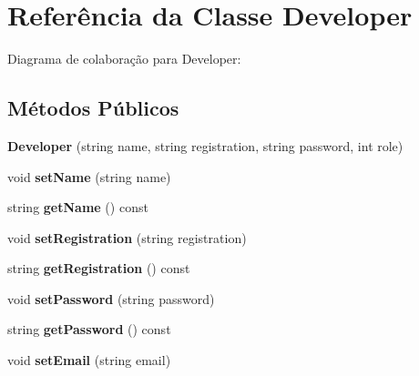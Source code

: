 \hypertarget{classDeveloper}{}\section{Referência da Classe Developer}
\label{classDeveloper}


Diagrama de colaboração para Developer\+:
\subsection*{Métodos Públicos}
\begin{DoxyCompactItemize}
\item 
{\bfseries Developer} (string name, string registration, string password, int role)\hypertarget{classDeveloper_a0262a978717ed4340bb712bbaaf7ed41}{}\label{classDeveloper_a0262a978717ed4340bb712bbaaf7ed41}

\item 
void {\bfseries set\+Name} (string name)\hypertarget{classDeveloper_ac24db20d968bb30086dea3ed21427eea}{}\label{classDeveloper_ac24db20d968bb30086dea3ed21427eea}

\item 
string {\bfseries get\+Name} () const \hypertarget{classDeveloper_ab596fa3410bc9ec868ae57cf81461ce7}{}\label{classDeveloper_ab596fa3410bc9ec868ae57cf81461ce7}

\item 
void {\bfseries set\+Registration} (string registration)\hypertarget{classDeveloper_a620148b1193325af581cdcc0060c9f23}{}\label{classDeveloper_a620148b1193325af581cdcc0060c9f23}

\item 
string {\bfseries get\+Registration} () const \hypertarget{classDeveloper_afddf351fc10780542d91fb1bf49adb9e}{}\label{classDeveloper_afddf351fc10780542d91fb1bf49adb9e}

\item 
void {\bfseries set\+Password} (string password)\hypertarget{classDeveloper_add3ff67a860e90384aaf2f9dbecdf7df}{}\label{classDeveloper_add3ff67a860e90384aaf2f9dbecdf7df}

\item 
string {\bfseries get\+Password} () const \hypertarget{classDeveloper_a4692d212288ca8e5914ec3f593b1f70b}{}\label{classDeveloper_a4692d212288ca8e5914ec3f593b1f70b}

\item 
void {\bfseries set\+Email} (string email)\hypertarget{classDeveloper_ae41461f5969dc1fc5253b077dbf89f96}{}\label{classDeveloper_ae41461f5969dc1fc5253b077dbf89f96}


\end{DoxyCompactItemize}
